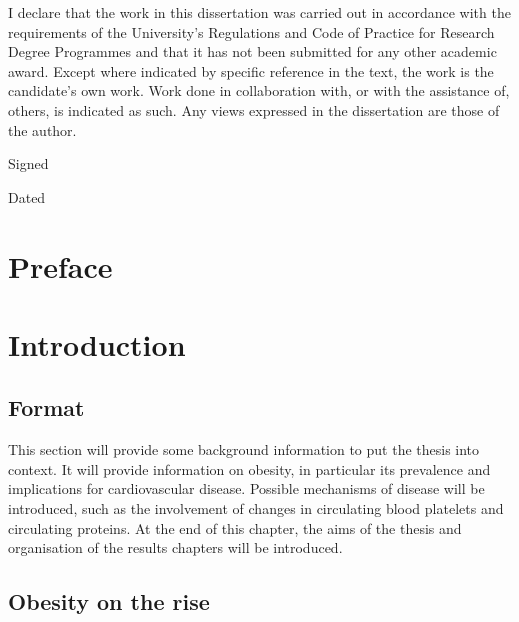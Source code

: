 \documentclass[11pt,twoside]{bristolthesis}
\begin{document}
  \begin{declaration}
    I declare that the work in this dissertation was carried out in accordance with the requirements of the University's Regulations and Code of Practice for Research Degree Programmes and that it has not been submitted for any other academic award. Except where indicated by specific reference in the text, the work is the candidate's own work. Work done in collaboration with, or with the assistance of, others, is indicated as such. Any views expressed in the dissertation are those of the author.

    \bigskip
    \bigskip
    \bigskip
    \bigskip
    \bigskip

    Signed

    \bigskip
    \bigskip
    \bigskip
    \bigskip
    \bigskip

    Dated
  \end{declaration}
  \hypersetup{linkcolor=black}
  \setcounter{tocdepth}{3}
  \tableofcontents
  \listoftables
  \listoffigures

\mainmatter %
\pagestyle{plain}
\hypertarget{preface}{%
\chapter*{Preface}\label{preface}}

\hypertarget{introduction}{%
\chapter*{Introduction}\label{introduction}}

\hypertarget{format}{%
\section{Format}\label{format}}

This section will provide some background information to put the thesis into context. It will provide information on obesity, in particular its prevalence and implications for cardiovascular disease. Possible mechanisms of disease will be introduced, such as the involvement of changes in circulating blood platelets and circulating proteins. At the end of this chapter, the aims of the thesis and organisation of the results chapters will be introduced.

\hypertarget{obesity-on-the-rise}{%
\section{Obesity on the rise}\label{obesity-on-the-rise}}
\end{document}
